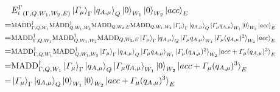 \begin{align}
    &{E_i^\Gamma}_{(\Gamma,Q,W_1,W_2,E)}\ket{\varGamma_\mu}_\Gamma\ket{q_{A,\mu}}_Q\ket{0}_{W_1}\ket{0}_{W_2}\ket{acc}_E\\
    =&\resizebox{.9\hsize}{!}{$\text{MADD}^\dagger_{\Gamma,Q,W_1}\text{MADD}^\dagger_{Q,W_1,W_2}\text{MADD}_{Q,W_2,E}\text{MADD}_{Q,W_1,W_2}\ket{\varGamma_\mu}_\Gamma\ket{q_{A,\mu}}_Q\ket{\varGamma_\mu q_{A,\mu}}_{W_1}\ket{0}_{W_2}\ket{acc}_E$}\\
    =&\resizebox{.9\hsize}{!}{$\text{MADD}^\dagger_{\Gamma,Q,W_1}\text{MADD}^\dagger_{Q,W_1,W_2}\text{MADD}_{Q,W_2,E}\ket{\varGamma_\mu}_\Gamma\ket{q_{A,\mu}}_Q\ket{\varGamma_\mu q_{A,\mu}}_{W_1}\ket{\varGamma_\mu (q_{A,\mu})^2}_{W_2}\ket{acc}_E$}\\
    =&\resizebox{.9\hsize}{!}{$\text{MADD}^\dagger_{\Gamma,Q,W_1}\text{MADD}^\dagger_{Q,W_1,W_2}\ket{\varGamma_\mu}_\Gamma\ket{q_{A,\mu}}_Q\ket{\varGamma_\mu q_{A,\mu}}_{W_1}\ket{\varGamma_\mu (q_{A,\mu})^2}_{W_2}\ket{acc+\varGamma_\mu (q_{A,\mu})^3}_E\label{comp}$}\\
    =&\text{MADD}^\dagger_{\Gamma,Q,W_1}\ket{\varGamma_\mu}_\Gamma\ket{q_{A,\mu}}_Q\ket{\varGamma_\mu q_{A,\mu}}_{W_1}\ket{0}_{W_2}\ket{acc+\varGamma_\mu (q_{A,\mu})^3}_E\\
    =&\ket{\varGamma_\mu}_\Gamma\ket{q_{A,\mu}}_Q\ket{0}_{W_1}\ket{0}_{W_2}\ket{acc+\varGamma_\mu (q_{A,\mu})^3}_E\\
\end{align}

